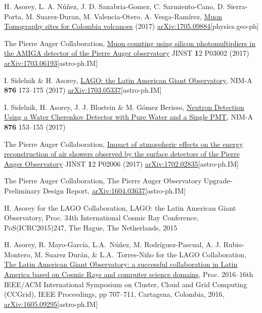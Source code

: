 \begin{etaremune}
\item {}H. Asorey, L. A. Núñez, J. D. Sanabria-Gomez, C. Sarmiento-Cano, D. Sierra-Porta, M. Suarez-Duran, M. Valencia-Otero, A. Vesga-Ramírez, \href{}{{Muon Tomography sites for Colombia volcanoes}} (2017) \href{http://arxiv.org/abs/1705.09884}{arXiv:1705.09884}[physics.geo-ph]

\item {}The Pierre Auger Collaboration, \href{https://doi.org/10.1088/1748-0221/12/03/P03002}{{Muon counting using silicon photomultipliers in the AMIGA detector of the Pierre Auger observatory}} JINST {\textbf 12} P03002 (2017) \href{http://arxiv.org/abs/1703.06193}{arXiv:1703.06193}[astro-ph.IM]

\item {}I. Sidelnik \& H. Asorey, \href{https://doi.org/10.1016/j.nima.2017.02.069}{{LAGO: the Latin American Giant Observatory}}, NIM-A {\textbf{876}} 173--175 (2017) \href{http://arxiv.org/abs/1703.05337}{arXiv:1703.05337}[astro-ph.IM]

\item {} I. Sidelnik, H. Asorey, J. J. Blostein \& M. Gómez Berisso, \href{https://doi.org/10.1016/j.nima.2017.02.048}{{Neutron Detection Using a Water Cherenkov Detector with Pure Water and a Single PMT}}, NIM-A {\textbf{876}} 153--155 (2017)

\item {}The Pierre Auger Collaboration, \href{https://doi.org/10.1088/1748-0221/12/02/P02006}{{Impact of atmospheric effects on the energy reconstruction of air showers observed by the surface detectors of the Pierre Auger Observatory}} JINST {\textbf 12} P02006 (2017) \href{http://arxiv.org/abs/1702.02835}{arXiv:1702.02835}[astro-ph.IM]

\item {} The Pierre Auger Collaboration, {{The Pierre Auger Observatory Upgrade-Preliminary Design Report}}, \href{http://arxiv.org/abs/1604.03637}{arXiv:1604.03637}[astro-ph.IM]

\item {}H. Asorey for the LAGO Collaboration, {{LAGO: the Latin American Giant Observatory}}, \en Proc.
34th International Cosmic Ray Conference, PoS(ICRC2015)247, The Hague, The Netherlands, 2015

\item {} H. Asorey, R. Mayo-García, L.A.\ Núñez, M. Rodríguez-Pascual, A. J. Rubio-Montero, M. Suarez Durán, \& L.A.\ Torres-Niño for the LAGO Collaboration, {{\href{http://dx.doi.org/10.1109/CCGrid.2016.110}{The Latin American Giant Observatory: a successful collaboration in Latin America based on Cosmic Rays and computer science domains}}}, \en Proc.
2016--16th IEEE/ACM International Symposium on Cluster, Cloud and Grid Computing (CCGrid), IEEE Proceedings, pp 707--711, Cartagena, Colombia, 2016, \href{http://arxiv.org/abs/1605.09295}{arXiv:1605.09295}[astro-ph.IM]


\end{etaremune}
